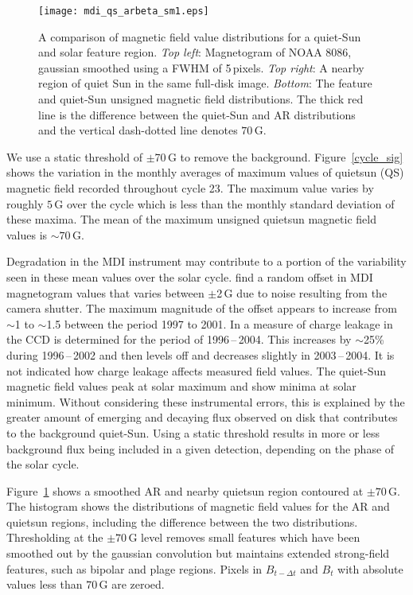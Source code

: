 \begin{figure}[!t]
\centerline{\texttt{[image: mdi\_qs\_arbeta\_sm1.eps]}}
\caption[AR magnetic field distribution.]{A comparison of magnetic field value distributions for a quiet-Sun and solar feature region. \emph{Top left}: Magnetogram of NOAA 8086, gaussian smoothed using a FWHM of 5\,pixels. \emph{Top right}: A nearby region of quiet Sun in the same full-disk image. \emph{Bottom}: The feature and quiet-Sun unsigned magnetic field distributions. The thick red line is the difference between the quiet-Sun and AR distributions and the vertical dash-dotted line denotes $70$\,G.}
\label{ar_qs_dist}
\end{figure}

We use a static threshold of $\pm$70\,G to remove the background. Figure~\ref{cycle_sig} shows the variation in the monthly averages of maximum values of \gls{quietsun} (QS) magnetic field recorded throughout cycle 23. The maximum value varies by roughly $5$\,G over the cycle which is less than the monthly standard deviation of these maxima. The mean of the maximum unsigned \gls{quietsun} magnetic field values is $\sim$$70$\,G. 

Degradation in the MDI instrument may contribute to a portion of the variability seen in these mean values over the solar cycle. \cite{Liu:2004} find a random offset in MDI magnetogram values that varies between $\pm$2\,G due to noise resulting from the camera shutter. The maximum magnitude of the offset appears to increase from $\sim$1 to $\sim$1.5 between the period 1997 to 2001. In \cite{Schou:2004} a measure of charge leakage in the CCD is determined for the period of 1996\,--\,2004. This increases by $\sim$25\% during 1996\,--\,2002 and then levels off and decreases slightly in 2003\,--\,2004. It is not indicated how charge leakage affects measured field values. The quiet-Sun magnetic field values peak at solar maximum and show minima at solar minimum. Without considering these instrumental errors, this is explained by the greater amount of emerging and decaying flux observed on disk that contributes to the background quiet-Sun. Using a static threshold results in more or less background flux being included in a given detection, depending on the phase of the solar cycle.

Figure~\ref{ar_qs_dist} shows a smoothed \gls{AR} and nearby \gls{quietsun} region contoured at $\pm$$70$\,G. The histogram shows the distributions of magnetic field values for the \gls{AR} and \gls{quietsun} regions, including the difference between the two distributions. Thresholding at the  $\pm$$70$\,G level removes small features which have been smoothed out by the gaussian convolution but maintains extended strong-field features, such as bipolar and plage regions. Pixels in $B_{t-\Delta t}$ and $B_{t}$ with absolute values less than $70$\,G are zeroed.

